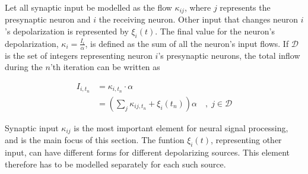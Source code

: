 	Let all synaptic input be modelled as the flow $\kappa_{ij}$, where $j$ represents the presynaptic neuron and $i$ the receiving neuron.
	Other input that changes neuron $i$'s depolarization is represented by $\xi_i(t)$.
	The final value for the neuron's depolarization, $\kappa_i = \frac{I_i}{\alpha}$, is defined as the sum of all the neuron's input flows.
	If $\mathscr{D}$ is the set of integers representing neuron $i$'s presynaptic neurons, the total inflow during the $n$'th iteration can be written as

		\begin{equation}
			\begin{split}
			I_{i, t_n} 	&= \kappa_{i,t_n} \cdot \alpha \\
						&= \left( \sum_{j} \kappa_{ij, t_n} + \xi_i(t_n) \right) \alpha \quad,\; j\in\mathscr{D}
			\end{split}
			\label{eqSynapticIntegrationForKANN}
		\end{equation}

	Synaptic input $\kappa_{ij}$ is the most important element for neural signal processing\cite{PrinciplesOfNeuralScience4edKAP10}, and is the main focus of this section.
	The funtion $\xi_i(t)$, representing other input, can have different forms for different depolarizing sources.
	This element therefore has to be modelled separately for each such source.

